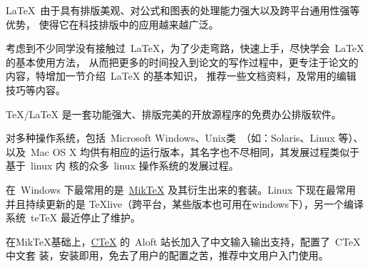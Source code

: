 
\label{Introduction}

\label{Introduction:background}
\LaTeX{}~由于具有排版美观、对公式和图表的处理能力强大以及跨平台通用性强等优势，
使得它在科技排版中的应用越来越广泛。

\label{sec:learningknowledge}
考虑到不少同学没有接触过~\LaTeX{}，为了少走弯路，快速上手，尽快学会~\LaTeX{}的基本使用方法，
从而把更多的时间投入到论文的写作过程中，更专注于论文的内容，特增加一节介绍~\LaTeX{} 的基本知识，
推荐一些文档资料，及常用的编辑技巧等内容。

\label{sec:whatislatex}
        \TeX/\LaTeX{} 是一套功能强大、排版完美的开放源程序的免费办公排版软件。

        对多种操作系统，包括~Microsoft Windows、\CJKglue Unix类~（如：Solaris、\CJKglue Linux 等）、\CJKglue
以及~Mac OS X 均供有相应的运行版本，其名字也不尽相同，其发展过程类似于基于~linux 内
核的众多~linux 操作系统的发展过程。

        在~Windows 下最常用的是~\href{http://www.miktex.org}{MikTeX} 及其衍生出来的套装。Linux 下现在最常用并且持续更新的是
        TeXlive（跨平台，某些版本也可用在windows下），另一个编译系统~teTeX 最近停止了维护。

        在MikTeX基础上，\href{http://www.ctex.org}{CTeX} 的~Aloft 站长加入了中文输入输出支持，配置了~CTeX 中文套
装，安装即用，免去了用户的配置之苦，推荐中文用户入门使用。

